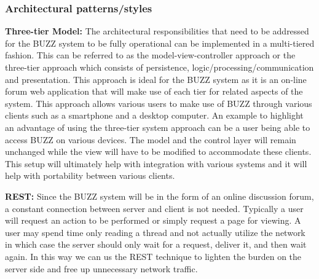 \subsubsection{Architectural patterns/styles}
\begin{flushleft}
\textbf{Three-tier Model:}
The architectural responsibilities that need to be addressed for the BUZZ system to be fully operational can be implemented in a multi-tiered fashion. This can be referred to as the model-view-controller approach or the three-tier approach which consists of persistence, logic/processing/communication and presentation. This approach is ideal for the BUZZ system as it is an on-line forum web application that will make use of each tier for related aspects of the system. This approach allows various users to make use of BUZZ through various clients such as a smartphone and a desktop computer. An example to highlight an advantage of using the three-tier system approach can be a user being able to access BUZZ on various devices. The model and the control layer will remain unchanged while the view will have to be modified to accommodate these clients.  This setup will ultimately help with integration with various systems and it will help with portability between various clients.
\end{flushleft}

\begin{flushleft}
\textbf{REST:}
 Since the BUZZ system will be in the form of an online discussion forum, a constant connection between server and client is not needed. Typically a user will request an action to be performed or simply request a page for viewing. A user may spend time only reading a thread and not actually utilize the network in which case the server should only wait for a request, deliver it, and then wait again. In this way we can us the REST technique to lighten the burden on the server side and free up unnecessary network traffic.
\end{flushleft}
